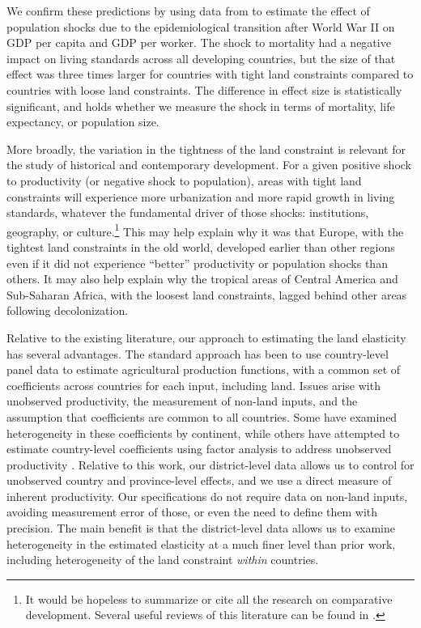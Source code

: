\documentclass[11pt]{article}
\begin{document}
We confirm these predictions by using data from \cite{aj07} to estimate the effect of population shocks due to the epidemiological transition after World War II on GDP per capita and GDP per worker. The shock to mortality had a negative impact on living standards across all developing countries, but the size of that effect was three times larger for countries with tight land constraints compared to countries with loose land constraints. The difference in effect size is statistically significant, and holds whether we measure the shock in terms of mortality, life expectancy, or population size.

More broadly, the variation in the tightness of the land constraint is relevant for the study of historical and contemporary development. For a given positive shock to productivity (or negative shock to population), areas with tight land constraints will experience more urbanization and more rapid growth in living standards, whatever the fundamental driver of those shocks: institutions, geography, or culture.\footnote{It would be hopeless to summarize or cite all the research on comparative development. Several useful reviews of this literature can be found in \cite{ajr2005handbook,nunn_2009,Galor:2011uq,sw2013,vries2013}.} This may help explain why it was that Europe, with the tightest land constraints in the old world, developed earlier than other regions even if it did not experience ``better'' productivity or population shocks than others. It may also help explain why the tropical areas of Central America and Sub-Saharan Africa, with the loosest land constraints, lagged behind other areas following decolonization.

Relative to the existing literature, our approach to estimating the land elasticity has several advantages. The standard approach has been to use country-level panel data \citep{Hayami:1970ly,Hayami:1985cr,cpr1997,mm2001,Mundlak:2000dq,mbl2012,et2013mango} to estimate agricultural production functions, with a common set of coefficients across countries for each input, including land. Issues arise with unobserved productivity, the measurement of non-land inputs, and the assumption that coefficients are common to all countries. Some have examined heterogeneity in these coefficients \citep{gg2003,Wiebe2003Resource-Qualit} by continent, while others have attempted to estimate country-level coefficients using factor analysis to address unobserved productivity \citep{et2013mango,ev2016clim}. Relative to this work, our district-level data allows us to control for unobserved country and province-level effects, and we use a direct measure of inherent productivity. Our specifications do not require data on non-land inputs, avoiding measurement error of those, or even the need to define them with precision. The main benefit is that the district-level data allows us to examine heterogeneity in the estimated elasticity at a much finer level than prior work, including heterogeneity of the land constraint \textit{within} countries. 
\end{document}
